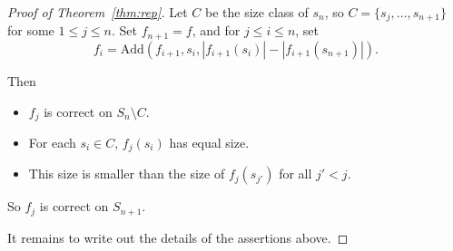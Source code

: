 \documentclass[12pt]{article}
\newcommand{\Add}{\text{Add}}
\begin{document}
\begin{proof}[Proof of Theorem~\ref{thm:rep}]
Let $C$ be the size class of $s_n$, so $C = \{s_j,\dots,s_{n+1}\}$ for some $1\leq j \leq n$. 
Set $f_{n+1} = f$, and for $j\leq i \leq n$, set $$f_i = \Add(f_{i+1}, s_i, |f_{i+1}(s_i)| - |f_{i+1}(s_{n+1})|).$$

Then 
\begin{itemize}
    \item $f_j$ is correct on $S_n\setminus C$.
    \item For each $s_i\in C$, $f_j(s_i)$ has equal size.
    \item This size is smaller than the size of $f_j(s_{j'})$ for all $j'<j$. 
\end{itemize}
So $f_j$ is correct on $S_{n+1}$. 

It remains to write out the details of the assertions above. 
\end{proof}
\end{document}
